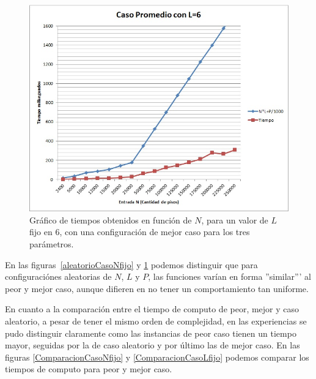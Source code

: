 \begin{figure}[H]
\centering
\includegraphics[scale=0.6]{../CasoPromedioEj2Lfijo.jpg}
\caption{Gráfico de tiempos obtenidos en función de $N$, para un valor de $ L $  fijo en 6, con una configuración de mejor caso para los tres parámetros.}
\label{aleatorioCasoLfijo}
\end{figure}

En las figuras~\ref{aleatorioCasoNfijo} y \ref{aleatorioCasoLfijo} podemos distinguir que para configuraciónes aleatorias de $ N $, $ L $ y $ P $, las funciones varían en forma ''similar''' al peor y mejor caso, aunque difieren en no tener un comportamiento tan uniforme.

En cuanto a la comparación entre el tiempo de computo de peor, mejor y caso aleatorio, a pesar de tener el mismo orden de complejidad, en las experiencias se pudo distinguir claramente como las instancias de peor caso tienen un tiempo mayor, seguidas por la de caso aleatorio y por último las de mejor caso. En las figuras \ref{ComparacionCasoNfijo} y \ref{ComparacionCasoLfijo} podemos comparar los tiempos de computo para peor y mejor caso.


